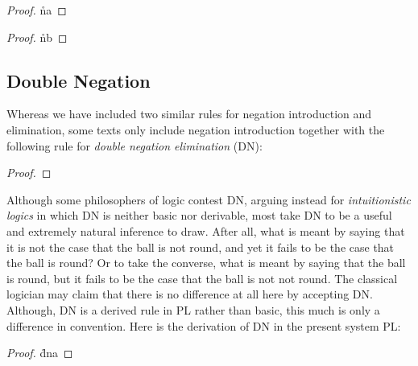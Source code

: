 \begin{multicols}{2}

\begin{proof}
  \open 
     \as{}
     
     \r{na}
  \close
   
\end{proof}

\begin{proof}
  \open 
     \as{}
     
     \r{nb}
  \close
   
\end{proof}

\end{multicols}



\subsection{Double Negation}
  \label{sub:PL-double_negation}

Whereas we have included two similar rules for negation introduction and elimination, some texts only include negation introduction together with the following rule for \textit{double negation elimination} (DN):

\begin{proof}
\end{proof}

Although some philosophers of logic contest DN, arguing instead for \textit{intuitionistic logics} in which DN is neither basic nor derivable, most take DN to be a useful and extremely natural inference to draw.
After all, what is meant by saying that it is not the case that the ball is not round, and yet it fails to be the case that the ball is round?
Or to take the converse, what is meant by saying that the ball is round, but it fails to be the case that the ball is not not round.
The classical logician may claim that there is no difference at all here by accepting DN.
Although, DN is a derived rule in PL rather than basic, this much is only a difference in convention.
Here is the derivation of DN in the present system PL:

\begin{proof}
  \open 
     
     \r{dna}
  \close
   
\end{proof}

